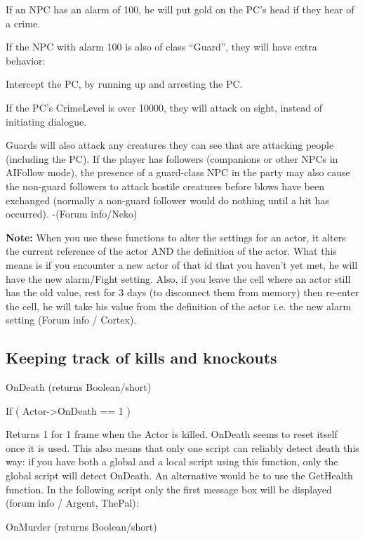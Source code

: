 \documentclass[
]{article}
\begin{document}
If an NPC has an alarm of 100, he will put gold on the PC's head if they
hear of a crime.

If the NPC with alarm 100 is also of class ``Guard'', they will have
extra behavior:

Intercept the PC, by running up and arresting the PC.

If the PC's CrimeLevel is over 10000, they will attack on sight, instead
of initiating dialogue.

Guards will also attack any creatures they can see that are attacking
people (including the PC). If the player has followers (companions or
other NPCs in AIFollow mode), the presence of a guard-class NPC in the
party may also cause the non-guard followers to attack hostile creatures
before blows have been exchanged (normally a non-guard follower would do
nothing until a hit has occurred). -(Forum info/Neko)

\textbf{Note:} When you use these functions to alter the settings for an
actor, it alters the current reference of the actor AND the definition
of the actor. What this means is if you encounter a new actor of that id
that you haven't yet met, he will have the new alarm/Fight setting.
Also, if you leave the cell where an actor still has the old value, rest
for 3 days (to disconnect them from memory) then re-enter the cell, he
will take his value from the definition of the actor i.e. the new alarm
setting (Forum info / Cortex).

\hypertarget{keeping-track-of-kills-and-knockouts}{%
\subsection{Keeping track of kills and
knockouts}\label{keeping-track-of-kills-and-knockouts}}

OnDeath (returns Boolean/short)

If ( Actor-\textgreater OnDeath == 1 )

Returns 1 for 1 frame when the Actor is killed. OnDeath seems to reset
itself once it is used. This also means that only one script can
reliably detect death this way: if you have both a global and a local
script using this function, only the global script will detect OnDeath.
An alternative would be to use the GetHealth function. In the following
script only the first message box will be displayed (forum info /
Argent, ThePal):



OnMurder (returns Boolean/short)
\end{document}

